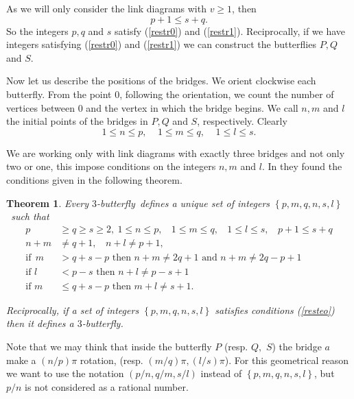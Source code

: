 \documentclass[12pt]{article}%
\newtheorem{theorem}{Theorem}
\begin{document}
As we will only consider the link diagrams with $v\geq1$, then
\begin{equation}
p+1\leq s+q. \label{restr1}%
\end{equation}
So the integers $p,q$ and $s$ satisfy (\ref{restr0}) and (\ref{restr1}).
Reciprocally, if we have integers satisfying (\ref{restr0}) and (\ref{restr1})
we can construct the butterflies $P,Q$ and $S$.

Now let us describe the positions of the bridges. We orient clockwise each
butterfly. From the point $0$, following the orientation, we count the number
of vertices between $0$ and the vertex in which the bridge begins. We call
$n,m$ and $l$ the initial points of the bridges in $P,Q$ and $S$,
respectively. Clearly
\begin{equation}
1\leq n\leq p,\ \ \ \ \ 1\leq m\leq q,\ \ \ \ \ 1\leq l\leq s. \label{restr2}%
\end{equation}


We are working only with link diagrams with exactly three bridges and not only
two or one, this impose conditions on the integers $n,m$ and $l$. In
\cite{HMTT4} they found the conditions given in the following theorem.

\begin{theorem}
\label{teoclassi}Every $3$-butterfly\textit{\ defines a unique set of integers
}$\left\{  p,m,q,n,s,l\right\}  $\textit{\ such that }%
$\ \ \ \ \ \ \ \mathit{\ }$
\begin{align}
p &  \geq q\geq s\geq2,\ 1\leq n\leq p,\ \ \ \ 1\leq m\leq q,\ \ \ \ 1\leq
l\leq s,\ \ \ \ p+1\leq s+q\label{resteo}\\
n+m &  \not =q+1,\ \ \ \ n+l\not =p+1,\ \nonumber\\
\text{if}\ \ m &  >q+s-p\text{ then }n+m\not =2q+1\text{ and }n+m\not =%
2q-p+1\ \nonumber\\
\text{if }l &  <p-s\text{ then }n+l\not =p-s+1\text{ }\nonumber\\
\text{if }m &  \leq q+s-p\text{ then\ }m+l\not =s+1.\nonumber
\end{align}


Reciprocally, if a set of integers $\left\{  p,m,q,n,s,l\right\}  $ satisfies
conditions (\ref{resteo}) then it defines a $3$-butterfly.
\end{theorem}

Note that we may think that inside the butterfly $P$ (resp. $Q,$ $S$) the
bridge $a$ make a $\left(  n/p\right)  \pi$ rotation, (resp. $\left(
m/q\right)  \pi,\left(  l/s\right)  \pi$). For this geometrical reason we want
to use the notation $\left(  p/n,q/m,s/l\right)  $ instead of $\left\{
p,m,q,n,s,l\right\}  $, but $p/n$ is not considered as a rational number.
\end{document}
